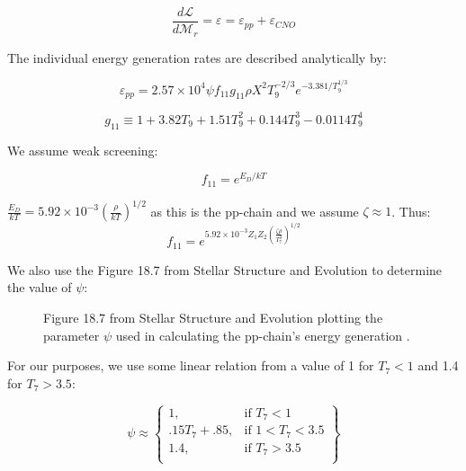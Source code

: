 \documentclass[twocolumn]{aastex631}
\begin{document}
\begin{equation}
	\frac{d\mathcal{L}}{d\mathcal{M}_r} = \varepsilon = \varepsilon_{pp} + \varepsilon_{CNO}
\end{equation}

The individual energy generation rates are described analytically by:

\begin{equation}
\varepsilon_{pp} = 2.57 \times 10^4 \psi f_{11} g_{11}\rho X^2T_9^{-2/3}e^{-3.381/T_9^{1/3}}
\end{equation}

\begin{equation} 
g_{11} \equiv 1 + 3.82T_9 + 1.51T_9^2 + 0.144T_9^3 - 0.0114T_9^4
\end{equation}

We assume weak screening:

\begin{equation} 
f_{11} = e^{E_D/kT}
\end{equation}

$\frac{E_D}{kT} = 5.92 \times 10^{-3} \left(\frac{\rho}{kT}\right)^{1/2}$ as this is the pp-chain and we assume $\zeta \approx 1$. Thus:
\begin{equation}
	f_{11}  = e^{5.92 \times 10^{-3} Z_1 Z_2 \left(\frac{\zeta\rho}{T_7^3}\right)^{1/2}}
\end{equation}

We also use the Figure 18.7 from Stellar Structure and Evolution to determine the value of $\psi$:

\begin{figure}[ht!]
	\caption{Figure 18.7 from Stellar Structure and Evolution plotting the parameter $\psi$ used in calculating the pp-chain's energy generation \citep{stelstrucev}.}
\end{figure}

For our purposes, we use some linear relation from a value of 1 for $T_7 < 1$ and 1.4 for $T_7 > 3.5$:

\begin{equation}
\psi \approx 
\left\{
    \begin{array}{ll}
        1, & \text{if } T_7 < 1\\
        .15 T_7 + .85, & \text{if } 1 < T_7 < 3.5\\
		1.4, & \text{if } T_7 > 3.5\\
    \end{array}
\right\}
\end{equation}
\end{document}
